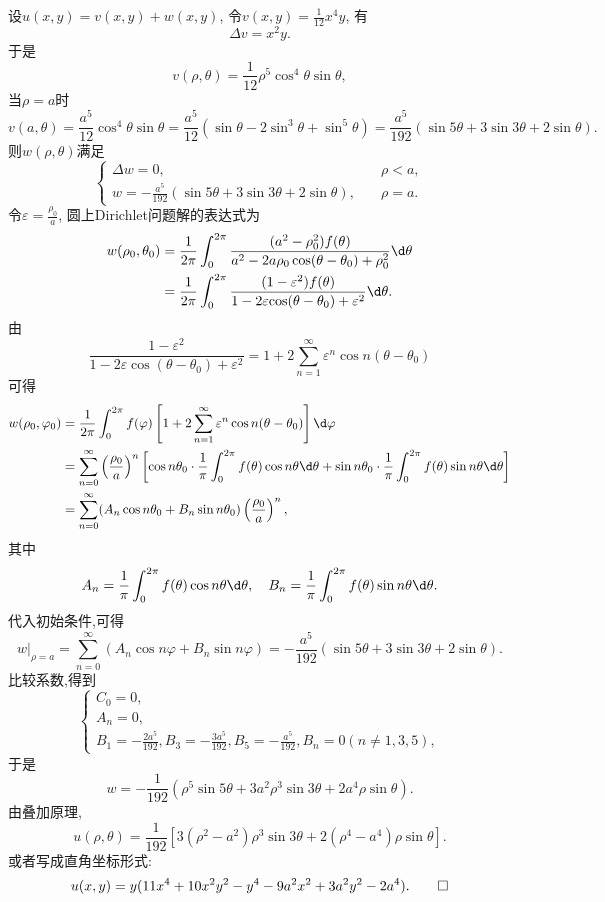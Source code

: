 \begin{solve}
	设$u(x,y)=v(x,y)+w(x,y)$, 令$\displaystyle v(x,y)=\frac{1}{12}x^4y$, 有
	\[\Delta v=x^2y.\]
	于是
	\[v(\rho,\theta)=\frac{1}{12}\rho^5\cos^4\theta\sin\theta,\]
	当$\rho=a$时
	\[v(a,\theta)=\frac{a^5}{12}\cos^4\theta\sin\theta=\frac{a^5}{12}(\sin\theta-2\sin^3\theta+\sin^5\theta)=\frac{a^5}{192}(\sin5\theta+3\sin3\theta+2\sin\theta).\]
	则$w(\rho,\theta)$满足
	\[\begin{cases}
		\Delta w = 0, \quad &\rho < a, \\
		\displaystyle w=-\frac{a^5}{192}(\sin5\theta+3\sin3\theta+2\sin\theta), \quad &\rho = a.
	\end{cases}\]
	令$\displaystyle\varepsilon=\frac{\rho_0}{a}$, 圆上Dirichlet问题解的表达式为
	$$\begin{aligned}
		w(\rho_{0},\theta_{0})&=\frac{1}{2\pi}\int_{0}^{2\pi}\frac{(a^2-\rho_{0}^{2})f(\theta)}{a^2-2a\rho_{0}\cos(\theta-\theta_0)+\rho_0^2}\d\theta\\
		&=\frac{1}{2\pi}\int_{0}^{2\pi}\frac{(1-\varepsilon^{2})f(\theta)}{1-2\varepsilon\mathrm{cos}(\theta-\theta_0)+\varepsilon^{2}}\d\theta.
	\end{aligned}$$
	由
	$$\frac{1-\varepsilon^2}{1-2\varepsilon\cos(\theta-\theta_0)+\varepsilon^2}=1+2\sum_{n=1}^\infty\varepsilon^n\cos n(\theta-\theta_0)$$
	可得
	$$\begin{aligned}
		w(\rho_{0},\varphi_{0})&=\frac{1}{2\pi} \int_{0}^{2\pi}f(\varphi) \left[1+2\sum_{n=1}^{\infty}\varepsilon^{n}\cos n(\theta-\theta_{0}) \right]\d\varphi \\
		&=\sum_{n=0}^\infty\left(\frac{\rho_0}a\right)^n\left[\cos n\theta_0\cdot\frac1\pi\int_0^{2\pi}f(\theta)\cos n\theta\d\theta+\sin n\theta_0\cdot\frac1\pi\int_0^{2\pi}f(\theta)\sin n\theta\d\theta\right] \\
		&=\sum_{n=0}^\infty(A_n\cos n\theta_0+B_n\sin n\theta_0)\left(\frac{\rho_0}a\right)^n,
	\end{aligned}$$
	其中
	$$A_n=\frac1{\pi}\int_0^{2\pi}f(\theta)\cos n\theta\d\theta,\quad B_n=\frac1{\pi }\int_0^{2\pi}f(\theta)\sin n\theta\d\theta.$$
	代入初始条件,可得
	\[w|_{\rho=a}=\sum_{n=0}^\infty\left(A_n\cos n\varphi+B_n\sin n\varphi\right)=-\frac{a^5}{192}(\sin5\theta+3\sin3\theta+2\sin\theta).\]
	比较系数,得到
	\[\begin{cases}
		C_0=0, \\
		A_n=0, \\
		\displaystyle B_1=-\frac{2a^5}{192},B_3=-\frac{3a^5}{192},B_5=-\frac{a^5}{192},B_n=0(n\neq 1,3,5),
	\end{cases}\]
	于是
	\[w=-\frac{1}{192}(\rho^5\sin5\theta+3a^2\rho^3\sin3\theta+2a^4\rho\sin\theta).\]
	由叠加原理,
	\[u(\rho,\theta)=\frac{1}{192}\left[3(\rho^2-a^2)\rho^3\sin3\theta+2(\rho^4-a^4)\rho\sin\theta\right].\]
	或者写成直角坐标形式:
	\[u(x,y)=y(11x^4+10x^2y^2-y^4-9a^2x^2+3a^2y^2-2a^4).\qedhere\]
\end{solve}


